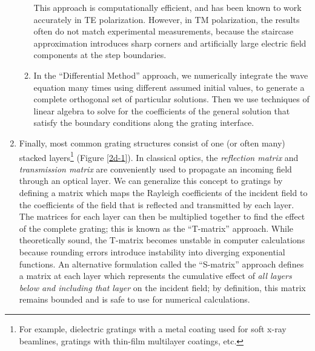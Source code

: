 \begin{enumerate}
\begin{enumerate}
	This approach is computationally efficient, and has been known to work accurately in TE polarization.  However, in TM polarization, the results often do not match experimental measurements, because the staircase approximation introduces sharp corners and artificially large electric field components at the step boundaries.
	\item In the ``Differential Method'' approach, we numerically integrate the wave equation many times using different assumed initial values, to generate a complete orthogonal set of particular solutions. Then we use techniques of linear algebra to solve for the coefficients of the general solution that satisfy the boundary conditions along the grating interface.
	\end{enumerate}
\item Finally, most common grating structures consist of one (or often many) stacked layers\footnote{For example, dielectric gratings with a metal coating used for soft x-ray beamlines, gratings with thin-film multilayer coatings, etc.} (Figure \ref{2d-1}).  In classical optics, the \emph{reflection matrix} and \emph{transmission matrix} are conveniently used to propagate an incoming field through an optical layer.  We can generalize this concept to gratings by defining a matrix which maps the Rayleigh coefficients of the incident field to the coefficients of the field that is reflected and transmitted by each layer.  The matrices for each layer can then be multiplied together to find the effect of the complete grating; this is known as the ``T-matrix'' approach.  While theoretically sound, the T-matrix becomes unstable in computer calculations because rounding errors introduce instability into diverging exponential functions.  An alternative formulation called the ``S-matrix'' approach defines a matrix at each layer which represents the cumulative effect of \emph{all layers below and including that layer} on the incident field; by definition, this matrix remains bounded and is safe to use for numerical calculations.
\end{enumerate}

